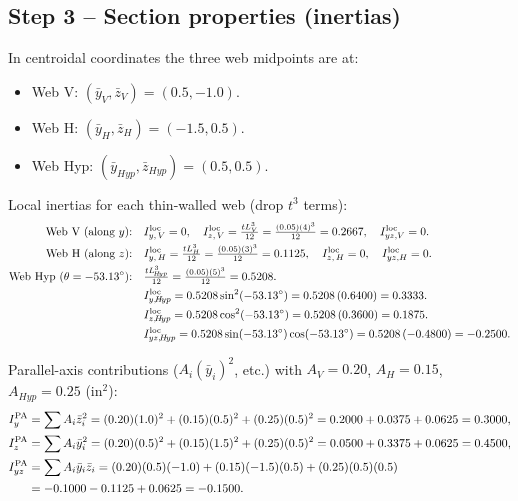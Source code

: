 \documentclass[11pt]{article}
\begin{document}
\subsection*{Step 3 -- Section properties (inertias)}

In centroidal coordinates the three web midpoints are at:
\begin{itemize}[leftmargin=2em, itemsep=0pt]
  \item Web V: $(\bar y_V, \bar z_V) = (0.5, -1.0)$.
  \item Web H: $(\bar y_H, \bar z_H) = (-1.5, 0.5)$.
  \item Web Hyp: $(\bar y_{\!H\!yp}, \bar z_{\!H\!yp}) = (0.5, 0.5)$.
\end{itemize}

Local inertias for each thin-walled web (drop $t^3$ terms):
\begin{align*}
\text{Web V (along $y$):}\quad & I_{y,\,V}^{\rm loc} = 0,\quad I_{z,\,V}^{\rm loc} = \tfrac{t L_V^3}{12} = \tfrac{(0.05)(4)^3}{12} = 0.2667,\quad I_{yz,V}^{\rm loc} = 0.\\
\text{Web H (along $z$):}\quad & I_{y,\,H}^{\rm loc} = \tfrac{t L_H^3}{12} = \tfrac{(0.05)(3)^3}{12} = 0.1125,\quad I_{z,\,H}^{\rm loc} = 0,\quad I_{yz,H}^{\rm loc} = 0.\\
\text{Web Hyp ($\theta = -53.13^\circ$):}\quad & \tfrac{t L_{\!H\!yp}^3}{12} = \tfrac{(0.05)(5)^3}{12} = 0.5208.\\
& I_{y,\!H\!yp}^{\rm loc} = 0.5208\sin^2(-53.13^\circ) = 0.5208\,(0.6400) = 0.3333.\\
& I_{z,\!H\!yp}^{\rm loc} = 0.5208\cos^2(-53.13^\circ) = 0.5208\,(0.3600) = 0.1875.\\
& I_{yz,\!H\!yp}^{\rm loc} = 0.5208\sin(-53.13^\circ)\cos(-53.13^\circ) = 0.5208\,(-0.4800) = -0.2500.
\end{align*}

Parallel-axis contributions ($A_i (\bar y_i)^2$, etc.) with $A_V = 0.20$, $A_H = 0.15$, $A_{\!H\!yp} = 0.25$ (in$^2$):
\begin{align*}
I_y^{\rm PA} &= \sum A_i \bar z_i^2 = (0.20)(1.0)^2 + (0.15)(0.5)^2 + (0.25)(0.5)^2 = 0.2000 + 0.0375 + 0.0625 = 0.3000,\\
I_z^{\rm PA} &= \sum A_i \bar y_i^2 = (0.20)(0.5)^2 + (0.15)(1.5)^2 + (0.25)(0.5)^2 = 0.0500 + 0.3375 + 0.0625 = 0.4500,\\
I_{yz}^{\rm PA} &= \sum A_i \bar y_i \bar z_i = (0.20)(0.5)(-1.0) + (0.15)(-1.5)(0.5) + (0.25)(0.5)(0.5)\\
&= -0.1000 - 0.1125 + 0.0625 = -0.1500.
\end{align*}
\end{document}
